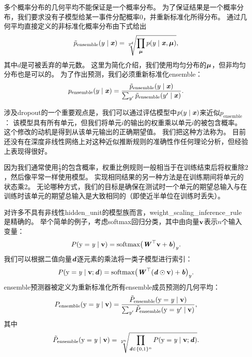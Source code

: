 多个概率分布的几何平均不能保证是一个概率分布。
为了保证结果是一个概率分布，我们要求没有子模型给某一事件分配概率0，并重新标准化所得分布。
通过几何平均直接定义的非标准化概率分布由下式给出
\begin{align}
\tilde{p}_{\text{ensemble}}(y \mid \boldsymbol{\mathit{x}}) = \sqrt[2^d]{\prod_{\boldsymbol{\mu}} p(y \mid \boldsymbol{\mathit{x}}, \boldsymbol{\mu})},
\end{align}
其中$d$是可被丢弃的单元数。
这里为简化介绍，我们使用均匀分布的$\boldsymbol{\mu}$，但非均匀分布也是可以的。
为了作出预测，我们必须重新标准化\gls{ensemble}：
\begin{align}
p_{\text{ensemble}}(y \mid \boldsymbol{\mathit{x}})  = \frac{\tilde{p}_{\text{ensemble}}(y \mid \boldsymbol{\mathit{x}})}
 {\sum_{y'}\tilde{p}_{\text{ensemble}}(y' \mid \boldsymbol{\mathit{x}}) }.
\end{align}
 
涉及\gls{dropout}的一个重要观点\citep{Hinton-et-al-arxiv2012}是，我们可以通过评估模型中$p(y \mid \boldsymbol{\mathit{x}})$来近似$ p_{\text{ensemble}}$：
该模型具有所有单元，但我们将单元$i$的输出的权重乘以单元$i$的被包含概率。
这个修改的动机是得到从该单元输出的正确期望值。
我们把这种方法称为。
目前还没有在深度非线性网络上对这种近似推断规则的准确性作任何理论分析，但经验上表现得很好。

 
因为我们通常使用$\frac{1}{2}$的包含概率，权重比例规则一般相当于在训练结束后将权重除$2$，然后像平常一样使用模型。
实现相同结果的另一种方法是在训练期间将单元的状态乘$2$。
无论哪种方式，我们的目标是确保在测试时一个单元的期望总输入与在训练时该单元的期望总输入是大致相同的（即使近半单位在训练时丢失）。

对许多不具有非线性\gls{hidden_unit}的模型族而言，\gls{weight_scaling_inference_rule}是精确的。
举个简单的例子，考虑\gls{softmax}回归分类，其中由向量$\mathbf{v}$表示$n$个输入变量：
\begin{align}
 P(\mathrm{y} = \mathit{y} \mid \mathbf{v}) = \text{softmax}\big(\boldsymbol{\mathit{W}}^\top\mathbf{v} + \boldsymbol{\mathit{b}}\big)_y.
\end{align}
我们可以根据二值向量$\boldsymbol{\mathit{d}}$逐元素的乘法将一类子模型进行索引：
\begin{align}
P(\mathrm{y} = \mathit{y} \mid \mathbf{v}; \boldsymbol{\mathit{d}}) = \text{softmax}\big(\boldsymbol{\mathit{W}}^\top(\boldsymbol{\mathit{d}} \odot \mathbf{v}) + \boldsymbol{\mathit{b}} \big)_y.
\end{align}
\gls{ensemble}预测器被定义为重新标准化所有\gls{ensemble}成员预测的几何平均：
\begin{align} \label{eq:758pe}
P_{\text{ensemble}}(\mathrm{y} = \mathit{y} \mid \mathbf{v})  = \frac{\tilde{P}_{\text{ensemble}}(\mathrm{y} = \mathit{y} \mid \mathbf{v})}
 {\sum_{y'}\tilde{P}_{\text{ensemble}}(\mathrm{y} = \mathit{y}' \mid \mathbf{v}) },
\end{align}
其中
\begin{align}
\tilde{P}_{\text{ensemble}}(\mathrm{y}=\mathit{y} \mid \mathbf{v}) =
\sqrt[2^n]{\prod_{\boldsymbol{\mathit{d}} \in \{0,1\}^n} P(\mathrm{y} = \mathit{y} \mid \mathbf{v}; \boldsymbol{\mathit{d}})}.
\end{align}

